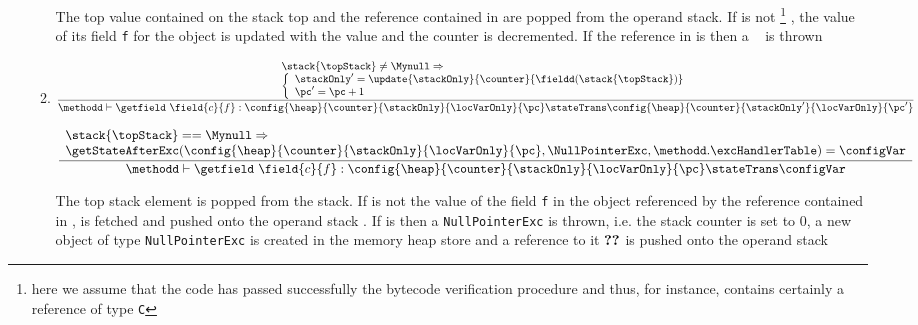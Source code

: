 \begin{itemize}
\begin{enumerate}
        The top value contained on the stack top \stack{\counter} and the reference contained in  
	are popped from the operand stack. If  is not \Mynull \footnote{here we assume that the code has passed successfully the bytecode verification procedure and thus,
	for instance,  contains certainly a reference        of type \texttt{C}  } , the value of its field 
	\texttt{f} for the object  is updated 
	with the value\stack{\counter} and the counter \counter is decremented.
	If the reference in  is \Mynull then a \NullPointerExc~ is thrown
          
        \item \getfield  
        	  
         $$ \frac{ \begin{array}{l}
                               \stack{\topStack} \neq \Mynull \Rightarrow \\
	                       \left\{\begin{array}{l}             
			             \stackOnly' =  \update{\stackOnly}{\counter}{ \fieldd(\stack{\topStack} ) }\\
			             \pc' = \pc + 1
	                       \end{array}\right.
	             \end{array}
                 }   
		 {\methodd \vdash  \getfield \ \field{c}{f}  :  \config{\heap}{\counter}{\stackOnly}{\locVarOnly}{\pc} 
						 \stateTrans  
						 \config{\heap}{\counter}{\stackOnly'}{\locVarOnly}{\pc'}} $$
			


        $$  \frac{ \begin{array}{l}
	                      \stack{\topStack} == \Mynull \Rightarrow \\
			       \getStateAfterExc( \config{\heap}{\counter}{\stackOnly}{\locVarOnly}{\pc}, \NullPointerExc, \methodd.\excHandlerTable ) =  \configVar                              \end{array}}
		  {\methodd \vdash  \getfield \ \field{c}{f}  :  \config{\heap}{\counter}{\stackOnly}{\locVarOnly}{\pc} 
						 \stateTrans  
						 \configVar} $$
	 
	The top stack element \stack{\topStack}  is popped from the stack. If \stack{\topStack} is not \Mynull the value of the field \texttt{f}
	in the object referenced by the reference contained in \stack{\topStack}, is fetched and pushed onto the operand stack \stack{\topStack}.
        If \stack{\topStack} is \Mynull then a \texttt{NullPointerExc} is thrown, i.e. the stack counter is set to 0, a new object of type
	\texttt{NullPointerExc} is created in the memory heap store \heap and a reference to it $\Ref{NullPointerExc}$ is pushed onto the operand stack					 
			

\end{enumerate}
\end{itemize}
